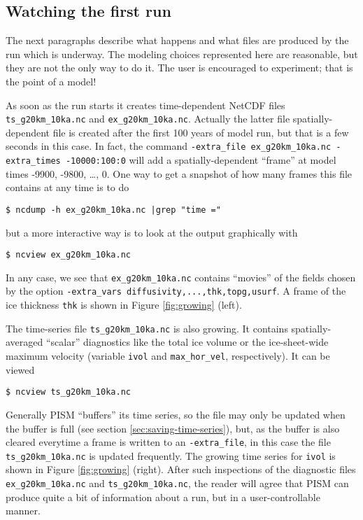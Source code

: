 \subsection{Watching the first run}  \label{subsect:watchrun}  The next paragraphs describe what happens and what files are produced by the run which is underway.  The modeling choices represented here are reasonable, but they are not the only way to do it.  The user is encouraged to experiment; that is the point of a model!

As soon as the run starts it creates time-dependent NetCDF files \texttt{ts_g20km_10ka.nc} and \texttt{ex_g20km_10ka.nc}.  Actually the latter file spatially-dependent file is created after the first 100 years of model run, but that is a few seconds in this case.  In fact, the command \texttt{-extra_file ex_g20km_10ka.nc -extra_times -10000:100:0} will add a spatially-dependent ``frame'' at model times -9900, -9800, \dots, 0.  One way to get a snapshot of how many frames this file contains at any time is to do
\begin{verbatim}
$ ncdump -h ex_g20km_10ka.nc |grep "time ="
\end{verbatim}
but a more interactive way is to look at the output graphically with
\begin{verbatim}
$ ncview ex_g20km_10ka.nc
\end{verbatim}
In any case, we see that \texttt{ex_g20km_10ka.nc} contains ``movies'' of the fields chosen by the option \texttt{-extra_vars diffusivity,...,thk,topg,usurf}.  A frame of the ice thickness \texttt{thk} is shown in Figure \ref{fig:growing} (left).

The time-series file \texttt{ts_g20km_10ka.nc} is also growing.  It contains spatially-averaged ``scalar'' diagnostics like the total ice volume or the ice-sheet-wide maximum velocity (variable \texttt{ivol} and \texttt{max_hor_vel}, respectively).  It can be viewed
\begin{verbatim}
$ ncview ts_g20km_10ka.nc
\end{verbatim}
Generally PISM ``buffers'' its time series, so the file may only be updated when the buffer is full (see section \ref{sec:saving-time-series}), but, as the buffer is also cleared everytime a frame is written to an \texttt{-extra_file}, in this case the file \texttt{ts_g20km_10ka.nc} is updated frequently.  The growing time series for \texttt{ivol} is shown in Figure \ref{fig:growing} (right).  After such inspections of the diagnostic files \texttt{ex_g20km_10ka.nc} and \texttt{ts_g20km_10ka.nc}, the reader will agree that PISM can produce quite a bit of information about a run, but in a user-controllable manner.

